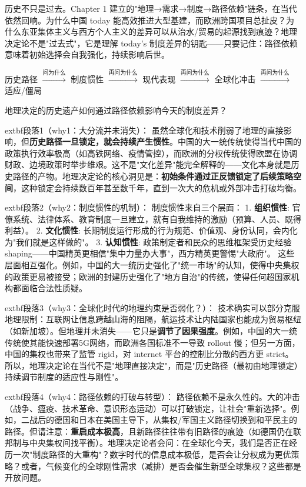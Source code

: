 \documentclass[../main.tex]{subfiles}
\begin{document}
\begin{motivation}
	历史不只是过去。Chapter 1 建立的"地理→需求→制度→路径依赖"链条，在当代依然回响。为什么中国 today 能高效推进大型基建，而欧洲跨国项目总扯皮？为什么东亚集体主义与西方个人主义的差异可以从治水/贸易的起源找到痕迹？地理决定论不是"过去式"，它是理解 today's 制度差异的钥匙——只要记住：路径依赖意味着初始选择会自我强化，持续影响后世。

\begin{logicmap}
	历史路径 $\xrightarrow{\text{问为什么}}$ 制度惯性 $\xrightarrow{\text{再问为什么}}$ 现代表现 $\xrightarrow{\text{再问为什么}}$ 全球化冲击 $\xrightarrow{\text{再问为什么}}$ 适应/僵局

\begin{questionbox}
	地理决定的历史遗产如何通过路径依赖影响今天的制度差异？

	extbf{段落1（why1：大分流并未消失）}：  
虽然全球化和技术削弱了地理的直接影响，但\textbf{历史路径一旦锁定，就会持续产生惯性}。中国的大一统传统使得当代中国的政策执行效率极高（如高铁网络、疫情管控），而欧洲的分权传统使得欧盟在协调财政、边境政策时举步维艰。这不是"文化差异"能完全解释的——文化本身就是历史路径的产物。地理决定论的核心洞见是：\textbf{初始条件通过正反馈锁定了后续策略空间}，这种锁定会持续数百年甚至数千年，直到一次大的危机或外部冲击打破均衡。

	extbf{段落2（why2：制度惯性的机制）}：  
制度惯性来自三个层面：
1. \textbf{组织惯性}: 官僚系统、法律体系、教育制度一旦建立，就有自我维持的激励（预算、人员、既得利益）。
2. \textbf{文化惯性}: 长期制度运行形成的行为规范、价值观、身份认同，会内化为"我们就是这样做的"。
3. \textbf{认知惯性}: 政策制定者和民众的思维框架受历史经验 shaping——中国精英更相信"集中力量办大事"，西方精英更警惕"大政府"。
这些层面相互强化。例如，中国的大一统历史强化了"统一市场"的认知，使得中央集权的政策更易被接受；欧洲的封建历史强化了"地方自治"的传统，使得任何超国家机构都面临合法性质疑。

	extbf{段落3（why3：全球化时代的地理约束是否弱化？）}：  
技术确实可以部分克服地理限制：互联网让信息跨越山海的阻隔，航运技术让内陆国家也能成为贸易枢纽（如新加坡）。但地理并未消失——它只是\textbf{调节了因果强度}。例如，中国的大一统传统使其能快速部署5G网络，而欧洲各国标准不一导致 rollout 慢；但另一方面，中国的集权也带来了监管 rigid，对 internet 平台的控制比分散的西方更 strict。所以，地理决定论在当代不是"地理直接决定"，而是"历史路径（最初由地理锁定）持续调节制度的适应性与刚性"。

	extbf{段落4（why4：路径依赖的打破与转型）}：  
路径依赖不是永久性的。大的冲击（战争、瘟疫、技术革命、意识形态运动）可以打破锁定，让社会"重新选择"。例如，二战后的德国和日本在美国主导下，从集权/军国主义路径切换到和平民主的路径。但请注意：\textbf{重启成本极高}，且新路径往往带有旧路径的痕迹（如德国仍在联邦制与中央集权间找平衡）。地理决定论者会问：在全球化今天，我们是否正在经历一次"制度路径的大重构"？数字时代的信息成本极低，是否会让分权成为更优策略？或者，气候变化的全球刚性需求（减排）是否会催生新型全球集权？这些都是开放问题。


\end{questionbox}
\end{logicmap}
\end{motivation}
\end{document}
